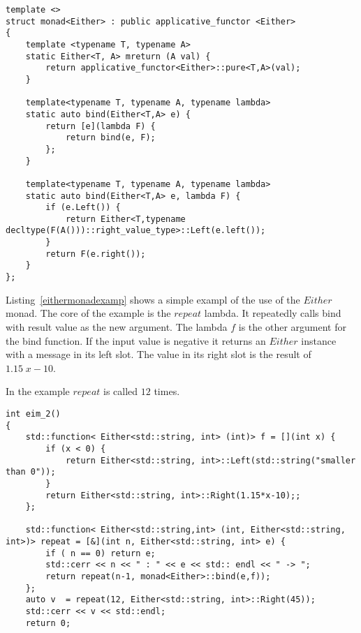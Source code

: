 \documentclass[12pt,fleqn]{article}
\begin{document}
%
%
\begin{minipage}{\linewidth}
\begin{lstlisting}[caption=Either monad,label=eithermonad]
template <>
struct monad<Either> : public applicative_functor <Either>
{
	template <typename T, typename A> 
	static Either<T, A> mreturn (A val) {
		return applicative_functor<Either>::pure<T,A>(val);
	}
	
	template<typename T, typename A, typename lambda>
	static auto bind(Either<T,A> e) {
		return [e](lambda F) {
			return bind(e, F);
		};
	}

	template<typename T, typename A, typename lambda> 
	static auto bind(Either<T,A> e, lambda F) {
		if (e.Left()) {
			return Either<T,typename decltype(F(A()))::right_value_type>::Left(e.left());
		}
		return F(e.right());
	}
};
\end{lstlisting}
\end{minipage}
%
%
%

Listing~\ref{eithermonadexamp} shows a simple exampl of the use of the $Either$ monad.
The core of the example is the $repeat$ lambda. 
It repeatedly calls bind with result value as the new argument.
The lambda $f$ is the other argument for the bind function.
If the input value is negative it returns an $Either$ instance with a message in its left slot.
The value in its right slot is the result of $1.15 \; x - 10$.

In the example $repeat$ is called $12$ times.

%
%
\begin{minipage}{\linewidth}
\begin{lstlisting}[caption=Example of the Either monad,label=eithermonadexamp]
int eim_2()
{
	std::function< Either<std::string, int> (int)> f = [](int x) {
		if (x < 0) {
			return Either<std::string, int>::Left(std::string("smaller than 0"));
		}
		return Either<std::string, int>::Right(1.15*x-10);;
	};

	std::function< Either<std::string,int> (int, Either<std::string, int>)> repeat = [&](int n, Either<std::string, int> e) {
		if ( n == 0) return e;
		std::cerr << n << " : " << e << std:: endl << " -> ";
		return repeat(n-1, monad<Either>::bind(e,f));
	}; 
	auto v  = repeat(12, Either<std::string, int>::Right(45));
	std::cerr << v << std::endl;
	return 0;
\end{lstlisting}
\end{minipage}
%
%
%


\end{document}

